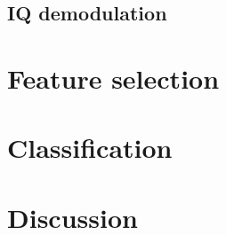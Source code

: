 \documentclass[a4paper, 12pt]{article}
\begin{document}
\subsection{IQ demodulation}

\section{Feature selection}

\section{Classification}

\section{Discussion}
\end{document}
